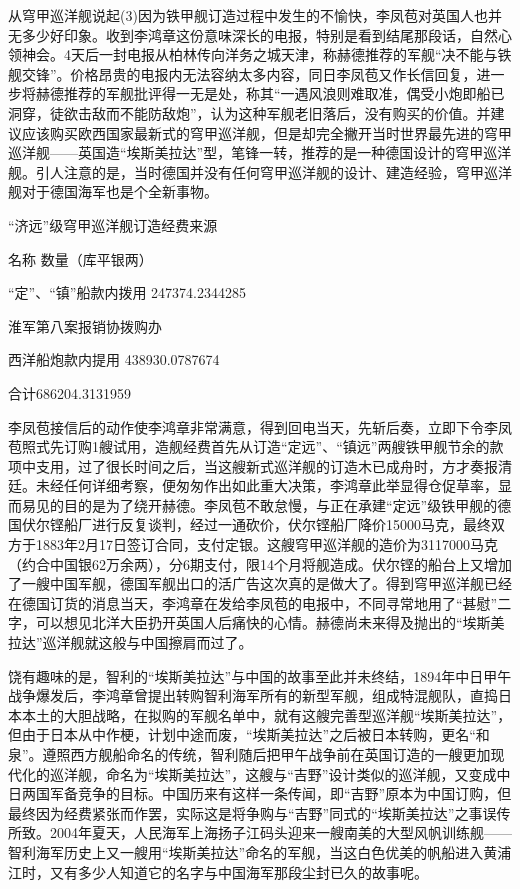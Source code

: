 \documentclass[12pt,UTF8]{ctexbook}
\begin{document}
从穹甲巡洋舰说起(3)因为铁甲舰订造过程中发生的不愉快，李凤苞对英国人也并无多少好印象。收到李鸿章这份意味深长的电报，特别是看到结尾那段话，自然心领神会。4天后一封电报从柏林传向洋务之城天津，称赫德推荐的军舰“决不能与铁舰交锋”。价格昂贵的电报内无法容纳太多内容，同日李凤苞又作长信回复，进一步将赫德推荐的军舰批评得一无是处，称其“一遇风浪则难取准，偶受小炮即船已洞穿，徒欲击敌而不能防敌炮”，认为这种军舰老旧落后，没有购买的价值。并建议应该购买欧西国家最新式的穹甲巡洋舰，但是却完全撇开当时世界最先进的穹甲巡洋舰——英国造“埃斯美拉达”型，笔锋一转，推荐的是一种德国设计的穹甲巡洋舰。引人注意的是，当时德国并没有任何穹甲巡洋舰的设计、建造经验，穹甲巡洋舰对于德国海军也是个全新事物。

“济远”级穹甲巡洋舰订造经费来源

名称 数量（库平银两）

“定”、“镇”船款内拨用 247374.2344285

淮军第八案报销协拨购办

西洋船炮款内提用 438930.0787674

合计686204.3131959

李凤苞接信后的动作使李鸿章非常满意，得到回电当天，先斩后奏，立即下令李凤苞照式先订购1艘试用，造舰经费首先从订造“定远”、“镇远”两艘铁甲舰节余的款项中支用，过了很长时间之后，当这艘新式巡洋舰的订造木已成舟时，方才奏报清廷。未经任何详细考察，便匆匆作出如此重大决策，李鸿章此举显得仓促草率，显而易见的目的是为了绕开赫德。李凤苞不敢怠慢，与正在承建“定远”级铁甲舰的德国伏尔铿船厂进行反复谈判，经过一通砍价，伏尔铿船厂降价15000马克，最终双方于1883年2月17日签订合同，支付定银。这艘穹甲巡洋舰的造价为3117000马克（约合中国银62万余两），分6期支付，限14个月将舰造成。伏尔铿的船台上又增加了一艘中国军舰，德国军舰出口的活广告这次真的是做大了。得到穹甲巡洋舰已经在德国订货的消息当天，李鸿章在发给李凤苞的电报中，不同寻常地用了“甚慰”二字，可以想见北洋大臣扔开英国人后痛快的心情。赫德尚未来得及抛出的“埃斯美拉达”巡洋舰就这般与中国擦肩而过了。

饶有趣味的是，智利的“埃斯美拉达”与中国的故事至此并未终结，1894年中日甲午战争爆发后，李鸿章曾提出转购智利海军所有的新型军舰，组成特混舰队，直捣日本本土的大胆战略，在拟购的军舰名单中，就有这艘完善型巡洋舰“埃斯美拉达”，但由于日本从中作梗，计划中途而废，“埃斯美拉达”之后被日本转购，更名“和泉”。遵照西方舰船命名的传统，智利随后把甲午战争前在英国订造的一艘更加现代化的巡洋舰，命名为“埃斯美拉达”，这艘与“吉野”设计类似的巡洋舰，又变成中日两国军备竞争的目标。中国历来有这样一条传闻，即“吉野”原本为中国订购，但最终因为经费紧张而作罢，实际这是将争购与“吉野”同式的“埃斯美拉达”之事误传所致。2004年夏天，人民海军上海扬子江码头迎来一艘南美的大型风帆训练舰——智利海军历史上又一艘用“埃斯美拉达”命名的军舰，当这白色优美的帆船进入黄浦江时，又有多少人知道它的名字与中国海军那段尘封已久的故事呢。
\end{document}
